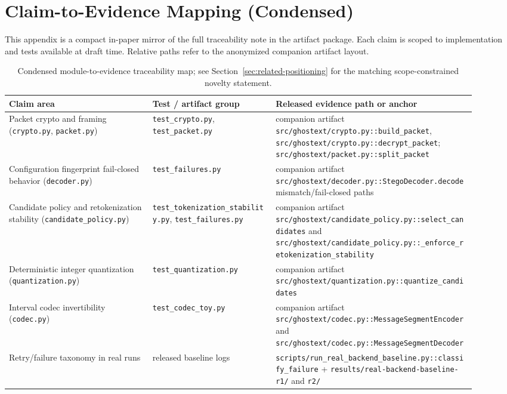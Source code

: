 \section{Claim-to-Evidence Mapping (Condensed)}

This appendix is a compact in-paper mirror of the full traceability note in the artifact package. Each claim is scoped to implementation and tests available at draft time. Relative paths refer to the anonymized companion artifact layout.

\begin{table}[h]
\caption{Condensed module-to-evidence traceability map; see Section~\ref{sec:related-positioning} for the matching scope-constrained novelty statement.}
\label{tab:appendix-claim-evidence}
\footnotesize
\begin{tabular}{p{0.28\linewidth}p{0.24\linewidth}p{0.39\linewidth}}
\toprule
Claim area & Test / artifact group & Released evidence path or anchor \\
\midrule
Packet crypto and framing (\texttt{crypto.py}, \texttt{packet.py}) & \texttt{test\_crypto.py}, \texttt{test\_packet.py} & companion artifact \nolinkurl{src/ghostext/crypto.py::build_packet}, \nolinkurl{src/ghostext/crypto.py::decrypt_packet}; \nolinkurl{src/ghostext/packet.py::split_packet} \\
Configuration fingerprint fail-closed behavior (\texttt{decoder.py}) & \texttt{test\_failures.py} & companion artifact \nolinkurl{src/ghostext/decoder.py::StegoDecoder.decode} mismatch/fail-closed paths \\
Candidate policy and retokenization stability (\texttt{candidate\_policy.py}) & \texttt{test\_tokenization\_stability.py}, \texttt{test\_failures.py} & companion artifact \nolinkurl{src/ghostext/candidate_policy.py::select_candidates} and \nolinkurl{src/ghostext/candidate_policy.py::_enforce_retokenization_stability} \\
Deterministic integer quantization (\texttt{quantization.py}) & \texttt{test\_quantization.py} & companion artifact \nolinkurl{src/ghostext/quantization.py::quantize_candidates} \\
Interval codec invertibility (\texttt{codec.py}) & \texttt{test\_codec\_toy.py} & companion artifact \nolinkurl{src/ghostext/codec.py::MessageSegmentEncoder} and \nolinkurl{src/ghostext/codec.py::MessageSegmentDecoder} \\
Retry/failure taxonomy in real runs & released baseline logs & \nolinkurl{scripts/run_real_backend_baseline.py::classify_failure} + \nolinkurl{results/real-backend-baseline-r1/} and \nolinkurl{r2/} \\

\end{tabular}
\end{table}
